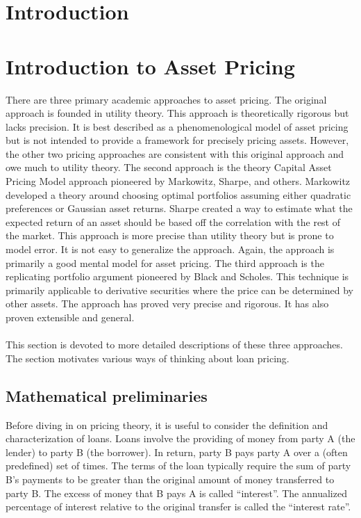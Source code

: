 \documentclass{article}
\theoremstyle{definition}
\begin{document}
\section{Introduction}

\section{Introduction to Asset Pricing}

There are three primary academic approaches to asset pricing.  The original approach is founded in utility theory.  This approach is theoretically rigorous but lacks precision.  It is best described as a phenomenological model of asset pricing but is not intended to provide a framework for precisely pricing assets.  However, the other two pricing approaches are consistent with this original approach and owe much to utility theory.  The second approach is the theory Capital Asset Pricing Model approach pioneered by Markowitz, Sharpe, and others.  Markowitz developed a theory around choosing optimal portfolios assuming either quadratic preferences or Gaussian asset returns.  Sharpe created a way to estimate what the expected return of an asset should be based off the correlation with the rest of the market.  This approach is more precise than utility theory but is prone to model error.  It is not easy to generalize the approach.  Again, the approach is primarily a good mental model for asset pricing.  The third approach is the replicating portfolio argument pioneered by Black and Scholes.  This technique is primarily applicable to derivative securities where the price can be determined by other assets.  The approach has proved very precise and rigorous.  It has also proven extensible and general.  
\\
\\
This section is devoted to more detailed descriptions of these three approaches.  The section motivates various ways of thinking about loan pricing.

\subsection{Mathematical preliminaries}
Before diving in on pricing theory, it is useful to consider the definition and characterization of loans.  Loans involve the providing of money from party A (the lender) to party B (the borrower).  In return, party B pays party A over a (often predefined) set of times.  The terms of the loan typically require the sum of party B's payments to be greater than the original amount of money transferred to party B.  The excess of money that B pays A is called ``interest''.  The annualized percentage of interest relative to the original transfer is called the ``interest rate''.  
\end{document}
